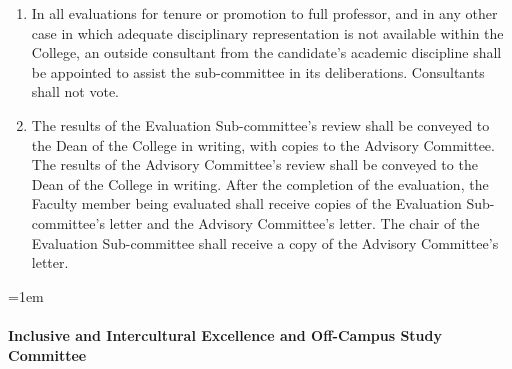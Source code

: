 \documentclass{manual}
\let\oldparagraph\paragraph
\renewcommand\paragraph{\leftskip=1em\oldparagraph}
\newcommand{\itemLevelA}{\alph*.}
\newcommand{\itemLevelB}{\arabic*)}
\newcommand{\itemRefA}{\alph*}
\newcommand{\itemRefB}{\arabic*}
\begin{document}
\begin{enumerate}[label=\itemLevelA,ref=\itemRefA]
\begin{enumerate}[label=\itemLevelB,ref=\itemRefB]
\item In all evaluations for tenure or promotion to full professor, and in any other case in which adequate disciplinary representation is not available within the College, an outside consultant from the candidate's academic discipline shall be appointed to assist the sub-committee in its deliberations. Consultants shall not vote.

\item \label{item:results09} The results of the Evaluation Sub-committee's review shall be conveyed to the Dean of the College in writing, with copies to the Advisory Committee. The results of the Advisory Committee's review shall be conveyed to the Dean of the College in writing. After the completion of the evaluation, the Faculty member being evaluated shall receive copies of the Evaluation Sub-committee's letter and the Advisory Committee's letter. The chair of the Evaluation Sub-committee shall receive a copy of the Advisory Committee's letter.

\end{enumerate}
\end{enumerate}


\paragraph{Inclusive and Intercultural Excellence and Off-Campus Study Committee}
\end{document}
